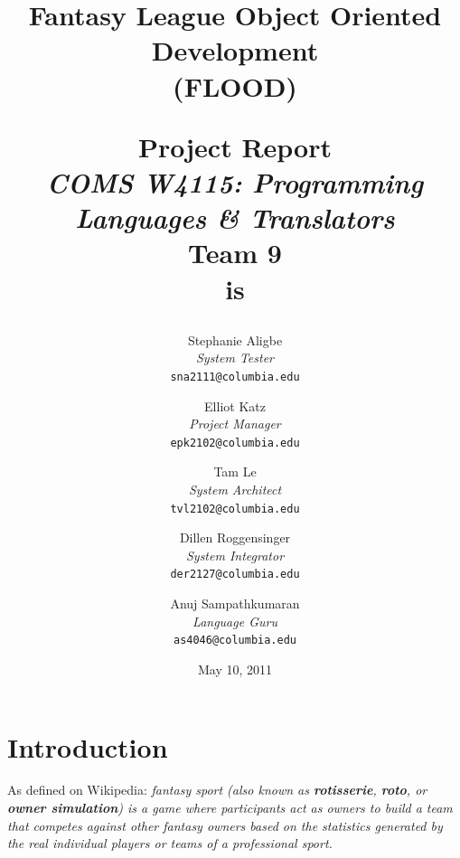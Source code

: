 \documentclass[12pt]{report}
\begin{document}
\title{
\textbf{Fantasy League Object Oriented Development}\\
\textbf{(FLOOD)}\\
\begin{doublespace}
\end{doublespace}
\LARGE{Project Report}\\
{\normalsize \textit{COMS W4115: Programming Languages \& Translators}}\\
{\normalsize \textbf{Team 9}}\\
\normalsize{\textbf{is}}
}

\begin{singlespace}
\author{
  Stephanie Aligbe\\
  \textit{\normalsize{System Tester}}\\
  \texttt{\small{sna2111@columbia.edu}}
  \and
  Elliot Katz\\
  \textit{\normalsize{Project Manager}}\\
  \texttt{\small{epk2102@columbia.edu}}
  \and
  Tam Le\\
  \textit{\normalsize{System Architect}}\\
  \texttt{\small{tvl2102@columbia.edu}}
  \and
  Dillen Roggensinger\\
  \textit{\normalsize{System Integrator}}\\
  \texttt{\small{der2127@columbia.edu}}
  \and
  Anuj Sampathkumaran\\
  \textit{\normalsize{Language Guru}}\\
  \texttt{\small{as4046@columbia.edu}}
}
\end{singlespace}

\date{May 10, 2011}

\maketitle

\doublespacing

\tableofcontents

\chapter{Introduction}

As defined on Wikipedia: \textit{fantasy sport (also known as \textbf{rotisserie}, \textbf{roto}, or \textbf{owner simulation}) is a game where participants act as owners to build a team that competes against other fantasy owners based on the statistics generated by the real individual players or teams of a professional sport.}
\end{document}
